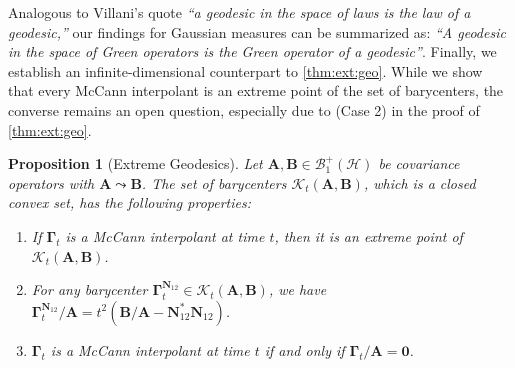 \documentclass[noinfoline]{imsart}\setcounter{tocdepth}{2}
\newcommand{\m}[1]{\mathbf{#1}} %
\renewcommand{\c}[1]{\mathcal{#1}} %
\theoremstyle{plain}
\newtheorem{proposition}[theorem]{Proposition}
\begin{document}
Analogous to Villani's quote \cite{villani2008optimal} \emph{``a geodesic in the space of laws is the law of a geodesic,''} our findings for Gaussian measures can be summarized as: \emph{``A geodesic in the space of Green operators is the Green operator of a geodesic''}. Finally, we establish an infinite-dimensional counterpart to \cref{thm:ext:geo}. While we show that every McCann interpolant is an extreme point of the set of barycenters, the converse remains an open question, especially due to (Case 2) in the proof of \cref{thm:ext:geo}.


\begin{proposition}[Extreme Geodesics]\label{prop:ext:geo:inf}
Let $\m{A}, \m{B} \in \c{B}_{1}^{+}(\c{H})$ be covariance operators with $\m{A} \leadsto \m{B}$. The set of barycenters $\c{K}_{t}(\m{A}, \m{B})$, which is a closed convex set, has the following properties:
\begin{enumerate}[leftmargin = *]
\item If $\m{\Gamma}_{t}$ is a McCann interpolant at time $t$, then it is an extreme point of $\c{K}_{t}(\m{A}, \m{B})$.
\item For any barycenter $\m{\Gamma}_{t}^{\m{N}_{12}} \in \c{K}_{t}(\m{A}, \m{B})$, we have $\m{\Gamma}_{t}^{\m{N}_{12}}/\m{A} = t^{2} (\m{B}/\m{A} - \m{N}_{12}^{*} \m{N}_{12})$.
\item $\m{\Gamma}_{t}$ is a McCann interpolant at time $t$ if and only if $\m{\Gamma}_{t}/\m{A} = \m{0}$.
\end{enumerate}
\end{proposition}
\end{document}

